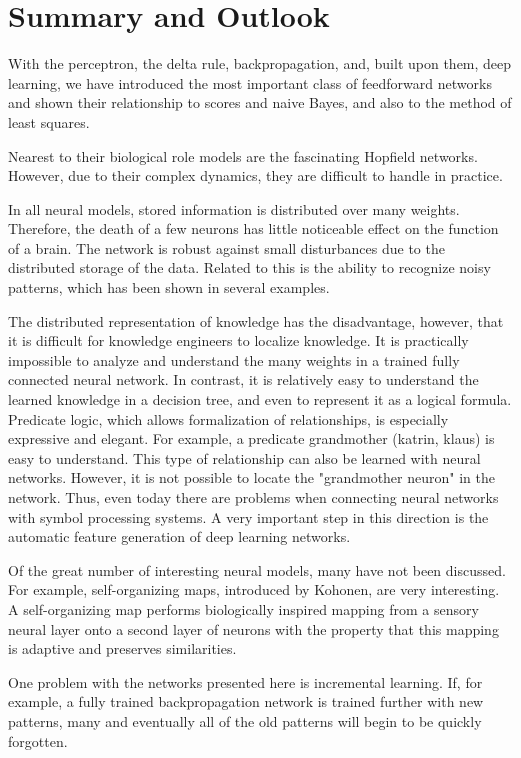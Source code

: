 \documentclass[10pt]{book}
\begin{document}
\section{Summary and Outlook}
With the perceptron, the delta rule, backpropagation, and, built upon them, deep learning, we have introduced the most important class of feedforward networks and shown their relationship to scores and naive Bayes, and also to the method of least squares.

Nearest to their biological role models are the fascinating Hopfield networks. However, due to their complex dynamics, they are difficult to handle in practice.

In all neural models, stored information is distributed over many weights. Therefore, the death of a few neurons has little noticeable effect on the function of a brain. The network is robust against small disturbances due to the distributed storage of the data. Related to this is the ability to recognize noisy patterns, which has been shown in several examples.

The distributed representation of knowledge has the disadvantage, however, that it is difficult for knowledge engineers to localize knowledge. It is practically impossible to analyze and understand the many weights in a trained fully connected neural network. In contrast, it is relatively easy to understand the learned knowledge in a decision tree, and even to represent it as a logical formula. Predicate logic, which allows formalization of relationships, is especially expressive and elegant. For example, a predicate grandmother (katrin, klaus) is easy to understand. This type of relationship can also be learned with neural networks. However, it is not possible to locate the "grandmother neuron" in the network. Thus, even today there are problems when connecting neural networks with symbol processing systems. A very important step in this direction is the automatic feature generation of deep learning networks.

Of the great number of interesting neural models, many have not been discussed. For example, self-organizing maps, introduced by Kohonen, are very interesting. A self-organizing map performs biologically inspired mapping from a sensory neural layer onto a second layer of neurons with the property that this mapping is adaptive and preserves similarities.

One problem with the networks presented here is incremental learning. If, for example, a fully trained backpropagation network is trained further with new patterns, many and eventually all of the old patterns will begin to be quickly forgotten.
\end{document}
